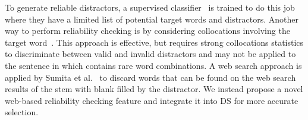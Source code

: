 To generate reliable distractors, a supervised classifier~\cite{lee2007automatic} is trained to do this job where they have a limited list of potential target words and distractors. 
Another way to perform reliability checking is by considering collocations 
involving the target word~\cite{smith2010gap,jiang2017distractor}. 
This approach is effective, but requires strong collocations statistics to 
discriminate between valid and invalid distractors and may not be applied to
the sentence in  which contains rare word combinations. 
A web search approach is applied by Sumita et al.~ to discard words that can be found on the web search results of the stem with blank filled by the distractor. We instead propose a novel web-based reliability checking feature and integrate it into DS for more accurate selection.
